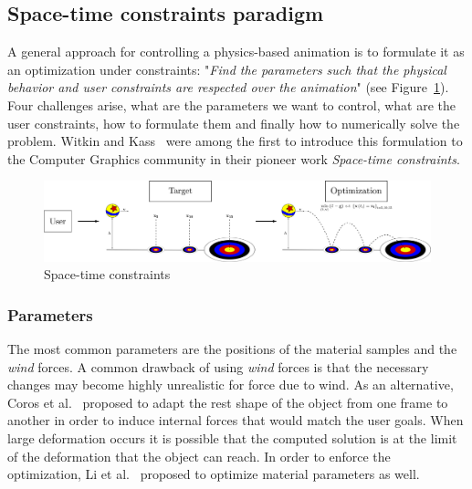 \subsection{Space-time constraints paradigm}
A general approach for controlling a physics-based animation is to formulate it as an optimization under constraints: 
"\emph{Find the parameters such that the physical behavior and user constraints are respected over the animation}" 
(see Figure~\ref{fig:spaceTimeConstraints}). 
Four challenges arise, what are the parameters we want to control, what are the user constraints, how to formulate them and finally how to numerically solve the problem. 
Witkin and Kass~\cite{Witkin1988} were among the first to introduce this formulation to the Computer Graphics community in their pioneer work \emph{Space-time constraints}.

\begin{figure}[!h]
\centering
\includegraphics[scale=0.20]{./images/simulationControl/spaceTimeConstraints.png}
\caption[STAR control: Space-time constraints]{\label{fig:spaceTimeConstraints} Space-time constraints}
\end{figure}

\subsubsection{Parameters}
The most common parameters are the positions of the material samples and the \emph{wind} forces.
A common drawback of using \emph{wind} forces is that the necessary changes may become highly unrealistic for force due to wind. 
As an alternative, Coros et al.~\cite{Coros2012} proposed to adapt the rest shape of the object from one frame to another in order to induce internal forces that would match the user goals.
When large deformation occurs it is possible that the computed solution is at the limit of the deformation that the object can reach. In order to enforce the optimization, Li et al.~\cite{Li2014} proposed to optimize material parameters as well. 

